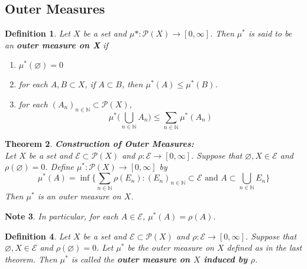 \documentclass[12pt]{amsart}
\newtheorem{thm}{Theorem}[subsection]
\newtheorem{defn}[thm]{Definition}
\newtheorem{note}[thm]{Note}
\newcommand{\N}{\mathbb{N}}
\newcommand{\MP}{\mathcal{P}}
\newcommand{\ME}{\mathcal{E}}
\begin{document}
	
	
	
	
	
	
	
	
	
	
	
	
	
	
	
	
	
	\subsection{Outer Measures}
	
	\begin{defn}
		Let $X$ be a set and $\mu* : \MP(X) \rightarrow [0, \infty]$. Then $\mu^*$ is said to be an \textbf{outer measure on X} if 
		\begin{enumerate}
			\item $\mu^*(\varnothing) = 0$
			\item for each $A,B \subset X $, if $A \subset B$, then $\mu^*(A) \leq \mu^*(B)$.
			\item for each $(A_n)_{n \in \N} \subset \MP(X)$, $$\mu^*\big(\bigcup\limits_{n \in \N} A_n\big) \leq \sum\limits_{n \in \N}\mu^*(A_n) $$
		\end{enumerate}
	\end{defn}
	
	\begin{thm}\textbf{Construction of Outer Measures:} \\
		Let $X$ be a set and $\ME \subset \MP(X)$ and $\rho: \ME \rightarrow [0, \infty]$. Suppose that $\varnothing, X \in \ME$ and $\rho(\varnothing) = 0$. Define $\mu^*:\MP(X) \rightarrow [0, \infty]$ by $$\mu^*(A) = \inf \bigg \{\sum_{n \in \N}\rho(E_n): (E_n)_{n \in \N} \subset \ME \text{ and }A \subset \bigcup_{n \in \N}E_n \bigg \}$$ Then $\mu^*$ is an outer measure on $X$.
	\end{thm}
	
	\begin{note}
		In particular, for each $A \in \ME$, $\mu^*(A) = \rho(A)$.
	\end{note}
	
	\begin{defn}
		Let $X$ be a set and $\ME \subset \MP(X)$ and $\rho: \ME \rightarrow [0, \infty]$. Suppose that $\varnothing, X \in \ME$ and $\rho(\varnothing) = 0$. Let $\mu^*$ be the outer measure on $X$ defined as in the last theorem. Then $\mu^*$ is called the \textbf{outer measure on $X$ induced by $\rho$}.
	\end{defn}
	
\end{document}
